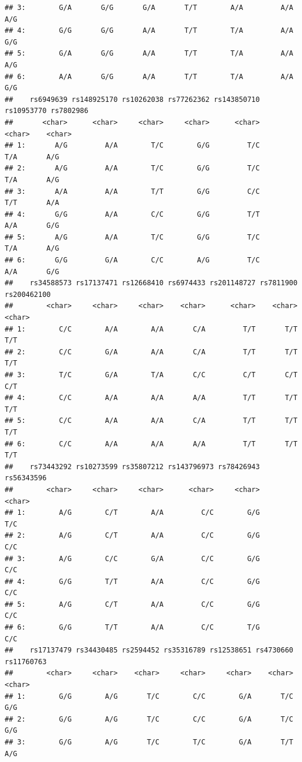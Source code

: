 \documentclass[
]{article}
\begin{document}
\begin{verbatim}
## 3:        G/A       G/G       G/A       T/T        A/A         A/A        A/G
## 4:        G/G       G/G       A/A       T/T        T/A         A/A        G/G
## 5:        G/A       G/G       A/A       T/T        T/A         A/A        A/G
## 6:        A/A       G/G       A/A       T/T        T/A         A/A        G/G
##    rs6949639 rs148925170 rs10262038 rs77262362 rs143850710 rs10953770 rs7802986
##       <char>      <char>     <char>     <char>      <char>     <char>    <char>
## 1:       A/G         A/A        T/C        G/G         T/C        T/A       A/G
## 2:       A/G         A/A        T/C        G/G         T/C        T/A       A/G
## 3:       A/A         A/A        T/T        G/G         C/C        T/T       A/A
## 4:       G/G         A/A        C/C        G/G         T/T        A/A       G/G
## 5:       A/G         A/A        T/C        G/G         T/C        T/A       A/G
## 6:       G/G         G/A        C/C        A/G         T/C        A/A       G/G
##    rs34588573 rs17137471 rs12668410 rs6974433 rs201148727 rs7811900 rs200462100
##        <char>     <char>     <char>    <char>      <char>    <char>      <char>
## 1:        C/C        A/A        A/A       C/A         T/T       T/T         T/T
## 2:        C/C        G/A        A/A       C/A         T/T       T/T         T/T
## 3:        T/C        G/A        T/A       C/C         C/T       C/T         C/T
## 4:        C/C        A/A        A/A       A/A         T/T       T/T         T/T
## 5:        C/C        A/A        A/A       C/A         T/T       T/T         T/T
## 6:        C/C        A/A        A/A       A/A         T/T       T/T         T/T
##    rs73443292 rs10273599 rs35807212 rs143796973 rs78426943 rs56343596
##        <char>     <char>     <char>      <char>     <char>     <char>
## 1:        A/G        C/T        A/A         C/C        G/G        T/C
## 2:        A/G        C/T        A/A         C/C        G/G        C/C
## 3:        A/G        C/C        G/A         C/C        G/G        C/C
## 4:        G/G        T/T        A/A         C/C        G/G        C/C
## 5:        A/G        C/T        A/A         C/C        G/G        C/C
## 6:        G/G        T/T        A/A         C/C        T/G        C/C
##    rs17137479 rs34430485 rs2594452 rs35316789 rs12538651 rs4730660 rs11760763
##        <char>     <char>    <char>     <char>     <char>    <char>     <char>
## 1:        G/G        A/G       T/C        C/C        G/A       T/C        G/G
## 2:        G/G        A/G       T/C        C/C        G/A       T/C        G/G
## 3:        G/G        A/G       T/C        T/C        G/A       T/T        A/G

\end{verbatim}
\end{document}
